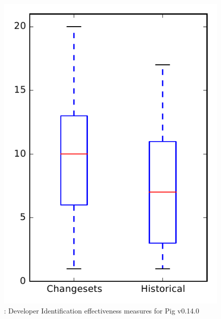 
\begin{figure}
\centering
\includegraphics[height=0.4\textheight]{figures/dit/rq2_pig}
\caption{\dtwo: Developer Identification effectiveness measures for Pig v0.14.0}
\label{fig:dit:rq2:pig}
\end{figure}

